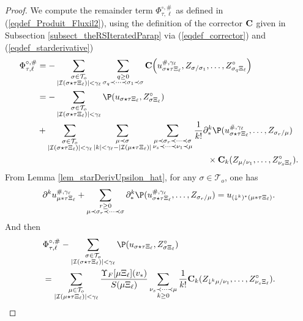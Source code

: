\documentclass[11pt]{preprint}
\newcommand{\mcI}{\mathcal{I}}
\newcommand{\mcT}{\mathcal{T}}
\def\eqref#1{(\ref{#1})}
\newcommand{\bfC}{{\bf C}}
\begin{document}
		\begin{proof}
		We compute the remainder term $\Phi_{\tau,\ell}^{\circ,\#}$ as defined in \eqref{eqdef_Produit_Fluxil2}, using the definition of the corrector ${\bf C}$ given in Subsection \ref{subsect_theRSIteratedParap} via \eqref{eqdef_corrector} and  \eqref{eqdef_starderivative}
		\begin{align*}
			\Phi_{\tau,\ell}^{\circ,\#}  &=
		-\sum_{\substack{\sigma\in\mcT_o \\ |\mcI(\sigma \star \tau\Xi_\ell)|<\gamma_\ell    }} \sum_{\substack{q\geq0 \\ \sigma_q\prec\dots\prec\sigma_1\prec\sigma }} {\bf C} \Big(u^{\#,\gamma_\ell}_{\sigma \star \tau\Xi_\ell},Z_{\sigma/\sigma_1}, \dots, Z^{\circ}_{\sigma_q\Xi_\ell}\Big) 
			\\
			& = -\sum_{\substack{\sigma\in\mcT_o \\ |\mcI(\sigma \star \tau\Xi_\ell)|<\gamma_\ell}} \P(u_{\sigma \star \tau\Xi_\ell}, Z_{\sigma\Xi_\ell}^\circ)  
			\\
			&+  \sum_{\substack{\sigma\in\mcT_o \\ |\mcI(\sigma \star \tau\Xi_\ell)|<\gamma_\ell}} \sum_{\substack{\mu\prec\sigma \\ |k|<\gamma_\ell-|\mcI(\mu \star \tau\Xi_\ell)|}}\sum_{\substack{ \mu\prec\sigma_r\prec\dots\prec\sigma \\ \nu_s\prec\dots\prec\nu_1\prec\mu  }} \frac{1}{k!} \partial^k_*\P(u_{\sigma \star \tau\Xi_\ell}^{\#,\gamma_\ell},\dots, Z_{\sigma_r/\mu}) \\ &\hspace{7cm}\times \bfC_k(Z_{\mu/\nu_1},\dots,Z^{\circ}_{\nu_s\Xi_\ell}).
		\end{align*}
		From Lemma \ref{lem_starDerivUpsilon_hat}, for any $\sigma\in\mcT_o$, one has 
		$$
		\partial^k u_{\mu*\tau\Xi_\ell}^{\#,\gamma_\ell} + \sum_{\substack{r\geq0 \\ \mu\prec \sigma_r\prec\dots\prec\sigma}} \partial^k_*\P( u_{\sigma \star \tau\Xi_\ell}^{\#,\gamma_\ell},\dots, Z_{\sigma_r/\mu})  = u_{(\downarrow^k)^*(\mu*\tau\Xi_\ell) }.
		$$
		And then 
		\begin{align*}
			&\Phi_{\tau,\ell}^{\circ,\#} - \sum_{\substack{\sigma\in\mcT_o \\ |\mcI(\sigma \star \tau\Xi_\ell)|< \gamma_{\ell}  }} \P(u_{\sigma \star \tau\Xi_\ell}, Z^{\circ}_{\sigma\Xi_\ell})  
			\\&=
			 \sum_{ \substack{\mu \in\mcT_o \\ |\mcI(\mu \star \tau\Xi_\ell)|< \gamma_{\ell}   }} \frac {\Upsilon_F[\mu\Xi_\ell](v_*)}{S(\mu \Xi_{\ell})} \sum_{\substack{\nu_s\prec\dots\prec\mu \\ k  \geq 0 }}  \frac{1}{k!}\bfC_k(Z_{\downarrow^k\mu/\nu_1},\dots,Z^{\circ}_{\nu_s\Xi_\ell}    ).

\end{align*}
\end{proof}
\end{document}
